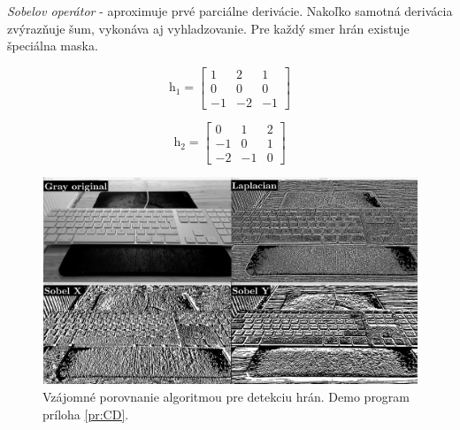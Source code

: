 \vspace{10mm}
\textit{Sobelov operátor} - aproximuje prvé parciálne derivácie. Nakoľko samotná derivácia zvýrazňuje šum, vykonáva aj vyhladzovanie. Pre každý smer hrán existuje špeciálna maska. \cite{Detekcia_a_rozpoznavanie_objektov}

\begin{figure}[H]
    \centering
    \begin{minipage}[b]{0.49\textwidth}
        \begin{equation}
            \textit{h}_1=\begin{bmatrix} 1 & 2 & 1 \\ 0 & 0 & 0 \\ -1 & -2 & -1  \end{bmatrix}
        \end{equation}
    \end{minipage}
    \hfill
    \begin{minipage}[b]{0.49\textwidth}
        \begin{equation}
            \textit{h}_2=\begin{bmatrix} 0 & 1 & 2 \\ -1 & 0 & 1 \\ -2 & -1 & 0  \end{bmatrix}
        \end{equation}
    \end{minipage}
\end{figure}


\begin{figure}[H]
\begin{center}
	\includegraphics[scale=0.13]{images/edgeDetector}
	\caption{Vzájomné porovnanie algoritmou pre detekciu hrán. Demo program príloha \ref{pr:CD}.}
	\end{center}
\end{figure}


